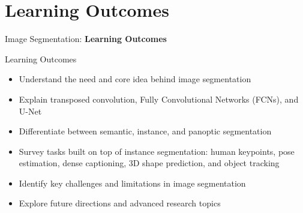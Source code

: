 \section{Learning Outcomes}
\begin{frame}{}
    \LARGE Image Segmentation: \textbf{Learning Outcomes}
\end{frame}

\begin{frame}{Learning Outcomes}
    \begin{itemize}
        \item Understand the need and core idea behind image segmentation
        \item Explain transposed convolution, Fully Convolutional Networks (FCNs), and U-Net
        \item Differentiate between semantic, instance, and panoptic segmentation
        \item Survey tasks built on top of instance segmentation: human keypoints, pose estimation, dense captioning, 3D shape prediction, and object tracking
        \item Identify key challenges and limitations in image segmentation
        \item Explore future directions and advanced research topics
    \end{itemize}
\end{frame}